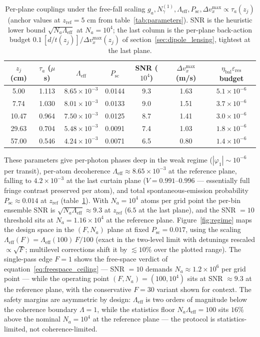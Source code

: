 \documentclass[11pt,a4paper]{article}
\begin{document}
\begin{table}[t]
\centering
\small
\caption{Per-plane couplings under the free-fall scaling $g_a, N_\gamma^{(1)}, \Lambda_\text{eff}, P_\text{sc}, \Delta v_x^\text{max} \propto \tau_a(z_j)$ (anchor values at $z_\text{ref} = 5$ cm from table~\ref{tab:parameters}). SNR is the heuristic lower bound $\sqrt{N_a\Lambda_\text{eff}}$ at $N_a = 10^4$; the last column is the per-plane back-action budget $0.1\,[d/t(z_j)]/\Delta v_x^\text{max}(z_j)$ of section~\ref{sec:dipole_lensing}, tightest at the last plane.}
\label{tab:couplings_planes}
\begin{tabular}{ccccccc}
\toprule
$z_j$ (cm) & $\tau_a$ ($\mu$s) & $\Lambda_\text{eff}$ & $P_\text{sc}$ & SNR ($10^4$) & $\Delta v_x^\text{max}$ (m/s) & $\eta_\text{bal}\varepsilon_\text{res}$ budget \\
\midrule
5.00 & 1.113 & $8.65\times 10^{-3}$ & 0.0144 & 9.3 & 1.63 & $5.1\times 10^{-6}$ \\
7.74 & 1.030 & $8.01\times 10^{-3}$ & 0.0133 & 9.0 & 1.51 & $3.7\times 10^{-6}$ \\
10.47 & 0.964 & $7.50\times 10^{-3}$ & 0.0125 & 8.7 & 1.41 & $3.0\times 10^{-6}$ \\
29.63 & 0.704 & $5.48\times 10^{-3}$ & 0.0091 & 7.4 & 1.03 & $1.8\times 10^{-6}$ \\
57.00 & 0.546 & $4.24\times 10^{-3}$ & 0.0071 & 6.5 & 0.80 & $1.4\times 10^{-6}$ \\
\bottomrule
\end{tabular}
\end{table}

These parameters give per-photon phases deep in the weak regime ($|\varphi_1| \sim 10^{-6}$ per transit), per-atom decoherence $\Lambda_\text{eff} \approx 8.65\times 10^{-3}$ at the reference plane, falling to $4.2\times 10^{-3}$ at the last curtain plane ($V = 0.991$--$0.996$ --- essentially full fringe contrast preserved per atom), and total spontaneous-emission probability $P_\text{sc} \approx 0.014$ at $z_\text{ref}$ (table~\ref{tab:couplings_planes}). With $N_a = 10^4$ atoms per grid point the per-bin ensemble SNR is $\sqrt{N_a\Lambda_\text{eff}} \approx 9.3$ at $z_\text{ref}$ ($6.5$ at the last plane), and the SNR $= 10$ threshold sits at $N_a = 1.16\times 10^4$ at the reference plane. Figure~\ref{fig:regime} maps the design space in the $(F, N_a)$ plane at fixed $P_\text{sc} = 0.017$, using the scaling $\Lambda_\text{eff}(F) = \Lambda_\text{eff}(100)\,F/100$ (exact in the two-level limit with detunings rescaled $\propto \sqrt{F}$; multilevel corrections shift it by $\lesssim 10\%$ over the plotted range). The single-pass edge $F = 1$ shows the free-space verdict of equation~\eqref{eq:freespace_ceiling} --- SNR $= 10$ demands $N_a \approx 1.2\times 10^6$ per grid point --- while the operating point $(F, N_a) = (100, 10^4)$ sits at SNR $\approx 9.3$ at the reference plane, with the conservative $F = 30$ variant shown for context. The safety margins are asymmetric by design: $\Lambda_\text{eff}$ is two orders of magnitude below the coherence boundary $\Lambda = 1$, while the statistics floor $N_a\Lambda_\text{eff} = 100$ sits $16\%$ above the nominal $N_a = 10^4$ at the reference plane --- the protocol is statistics-limited, not coherence-limited.
\end{document}
